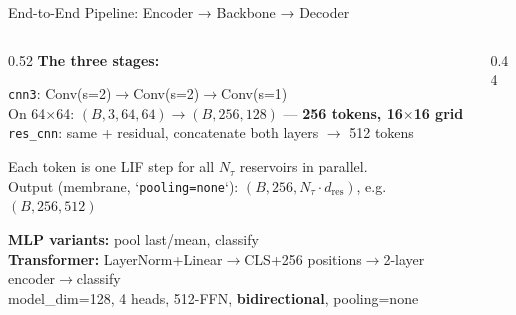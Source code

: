 \documentclass[aspectratio=169,11pt]{beamer}
\newcommand{\hl}[1]{{\color{highlight}\textbf{#1}}}
\newcommand{\blue}[1]{{\color{accent1}#1}}
\newcommand{\orange}[1]{{\color{accent0}#1}}
\newcommand{\green}[1]{{\color{accent2}#1}}
\begin{document}
\begin{frame}[shrink=8]{End-to-End Pipeline: Encoder → Backbone → Decoder}
\begin{columns}[T]
\begin{column}{0.52\textwidth}
  \textbf{The three stages:}
  \vspace{0.3em}

  \begin{tcolorbox}[mybox,title={\orange{Encoder} — image $\to$ token sequence}]
    \scriptsize
    \texttt{cnn3}: Conv(s=2)$\to$Conv(s=2)$\to$Conv(s=1)\\
    On 64$\times$64: $(B,3,64,64)\to(B,256,128)$ — \hl{256 tokens, 16$\times$16 grid}\\
    \texttt{res\_cnn}: same + residual, concatenate both layers $\to$ 512 tokens
  \end{tcolorbox}
  \vspace{0.3em}
  \begin{tcolorbox}[mybox,title={\blue{Backbone} — tokens $\to$ reservoir states}]
    \scriptsize
    Each token is one LIF step for all $N_\tau$ reservoirs in parallel.\\
    Output (membrane, `\texttt{pooling=none}`):
    $(B, 256, N_\tau \cdot d_\text{res})$, e.g.\ $(B,256,512)$
  \end{tcolorbox}
  \vspace{0.3em}
  \begin{tcolorbox}[mybox,title={\green{Decoder} — states $\to$ logits}]
    \scriptsize
    \textbf{MLP variants:} pool last/mean, classify\\
    \textbf{Transformer:} LayerNorm+Linear$\to$CLS+256 positions$\to$2-layer encoder$\to$classify\\
    model\_dim=128, 4 heads, 512-FFN, \textbf{bidirectional}, pooling=none
  \end{tcolorbox}
\end{column}
\begin{column}{0.44\textwidth}
  \vspace{0.5em}
\end{column}
\end{columns}
\end{frame}
\end{document}
